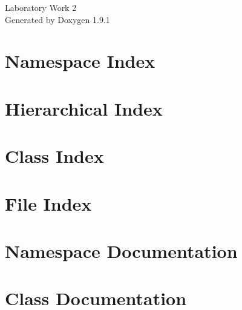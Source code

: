 \let\mypdfximage\pdfximage\def\pdfximage{\immediate\mypdfximage}\documentclass[twoside]{book}
\newcommand{\+}{\discretionary{\mbox{\scriptsize$\hookleftarrow$}}{}{}}
\newcommand{\clearemptydoublepage}{%
  \newpage{\pagestyle{empty}\cleardoublepage}%
}
\begin{document}
\raggedbottom

\hypersetup{pageanchor=false,
             bookmarksnumbered=true,
             pdfencoding=unicode
            }
\begin{titlepage}
\vspace*{7cm}
\begin{center}%
{\Large Laboratory Work 2 }\\
\vspace*{1cm}
{\large Generated by Doxygen 1.9.1}\\
\end{center}
\end{titlepage}
\clearemptydoublepage
{}
\tableofcontents
\clearemptydoublepage
{}
\hypersetup{pageanchor=true}

\chapter{Namespace Index}

\chapter{Hierarchical Index}

\chapter{Class Index}

\chapter{File Index}

\chapter{Namespace Documentation}


\chapter{Class Documentation}





























\end{document}
